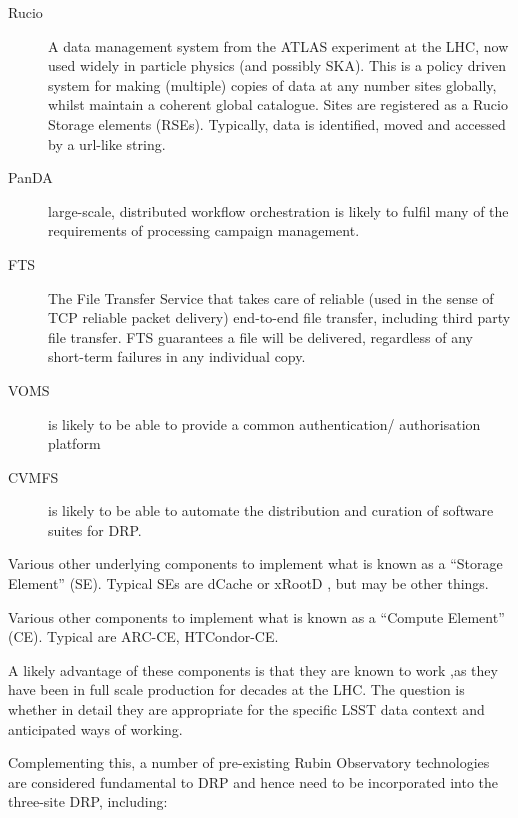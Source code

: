 \begin{description}

\item[Rucio] A data management system from the ATLAS experiment at the LHC, now used widely in particle physics (and possibly SKA). This is a policy driven system for making (multiple) copies of data at any number sites globally, whilst maintain a coherent global catalogue. Sites are registered as a Rucio Storage elements (RSEs).  Typically, data is identified, moved and accessed by a url-like string.  

\item[PanDA] large-scale, distributed workflow orchestration is likely to fulfil many of the requirements of processing campaign management. 

\item[FTS]  The File Transfer Service that takes care of reliable (used in the sense of TCP reliable packet delivery) end-to-end file transfer, including third party file transfer. FTS guarantees a file will be delivered, regardless of any short-term failures in any individual copy. 

\item[VOMS] is likely to be able to provide a common authentication/ authorisation platform

\item[CVMFS] is likely to be able to automate the distribution and curation of software suites for DRP.

\end{description}

Various other underlying components to implement what is known as a “Storage Element” (SE). Typical SEs are dCache or xRootD , but may be other things.
  
Various other components to implement what is known as a “Compute Element”  (CE). Typical are ARC-CE, HTCondor-CE.

A likely advantage of these components is that they are known to work ,as they have been in full scale production for decades at the LHC. The question is whether in detail they are appropriate for the specific LSST data context and anticipated ways of working.

Complementing this, a number of pre-existing Rubin Observatory technologies are considered fundamental to DRP and hence need to be incorporated into the three-site DRP, including:

